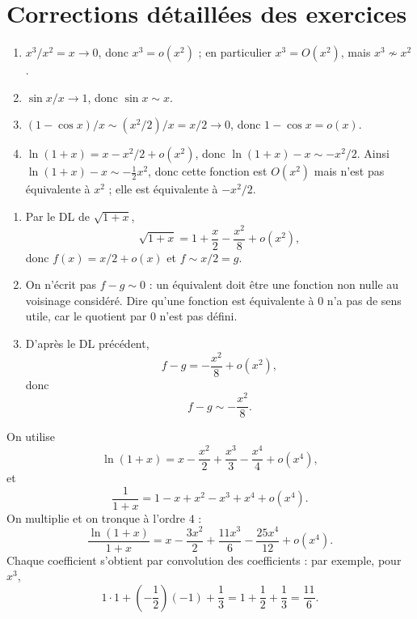 \documentclass[11pt,a4paper]{article}
\newcounter{exercice}
\newenvironment{corrige}[1][]{\begin{tcolorbox}[colframe=vertprepa!70!black,colback=green!2!white,title={Correction \ifx\relax#1\relax\else{} — #1\fi}]}{\end{tcolorbox}}
\begin{document}
\newpage
\section{Corrections détaillées des exercices}

\begin{corrige}[Exercice 1]
\begin{enumerate}[label=\alph*)]
\item $x^3/x^2=x\to0$, donc $x^3=o(x^2)$ ; en particulier $x^3=O(x^2)$, mais $x^3\not\sim x^2$.
\item $\sin x/x\to1$, donc $\sin x\sim x$.
\item $(1-\cos x)/x\sim (x^2/2)/x=x/2\to0$, donc $1-\cos x=o(x)$.
\item $\ln(1+x)=x-x^2/2+o(x^2)$, donc $\ln(1+x)-x\sim -x^2/2$. Ainsi $\ln(1+x)-x\sim -\frac12 x^2$, donc cette fonction est $O(x^2)$ mais n'est pas équivalente à $x^2$ ; elle est équivalente à $-x^2/2$.
\end{enumerate}
\end{corrige}

\begin{corrige}[Exercice 2]
\begin{enumerate}[label=\alph*)]
\item Par le DL de $\sqrt{1+x}$,
\[
  \sqrt{1+x}=1+\frac x2-\frac{x^2}{8}+o(x^2),
\]
donc $f(x)=x/2+o(x)$ et $f\sim x/2=g$.
\item On n'écrit pas $f-g\sim0$ : un équivalent doit être une fonction non nulle au voisinage considéré. Dire qu'une fonction est équivalente à $0$ n'a pas de sens utile, car le quotient par $0$ n'est pas défini.
\item D'après le DL précédent,
\[
  f-g=-\frac{x^2}{8}+o(x^2),
\]
donc
\[
  f-g\sim-\frac{x^2}{8}.
\]
\end{enumerate}
\end{corrige}

\begin{corrige}[Exercice 3]
On utilise
\[
  \ln(1+x)=x-\frac{x^2}{2}+\frac{x^3}{3}-\frac{x^4}{4}+o(x^4),
\]
et
\[
  \frac1{1+x}=1-x+x^2-x^3+x^4+o(x^4).
\]
On multiplie et on tronque à l'ordre $4$ :
\[
\frac{\ln(1+x)}{1+x}
=x-\frac{3x^2}{2}+\frac{11x^3}{6}-\frac{25x^4}{12}+o(x^4).
\]
Chaque coefficient s'obtient par convolution des coefficients : par exemple, pour $x^3$,
\[
  1\cdot1+\left(-\frac12\right)(-1)+\frac13=1+\frac12+\frac13=\frac{11}{6}.
\]
\end{corrige}
\end{document}

